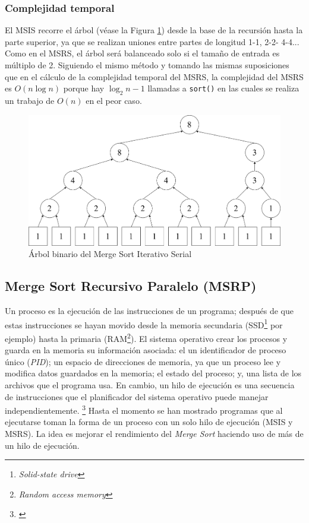 \documentclass[titlepage]{article}
\begin{document}
\subsubsection{Complejidad temporal}
El MSIS recorre el árbol (véase la Figura \ref{fig:arbolMSIS}) desde la base de la recursión hasta la parte superior, ya que se realizan uniones entre partes de longitud 1-1, 2-2- 4-4... Como en el MSRS, el árbol será balanceado solo si el tamaño de entrada es múltiplo de 2. Siguiendo el mismo método y tomando las mismas suposiciones que en el cálculo de la complejidad temporal del MSRS, la complejidad del MSRS es \(O(n \log{n})\) porque hay \(\log_2{n}-1\) llamadas a \lstinline{sort()} en las cuales se realiza un trabajo de \(O(n)\) en el peor caso.

\begin{figure}
    \centering
    \includegraphics[width=0.7\linewidth]{Diagrames/arbolMSISirregular.png}
    \caption{Árbol binario del Merge Sort Iterativo Serial}
    \label{fig:arbolMSIS}
\end{figure}


\newpage
\subsection{Merge Sort Recursivo Paralelo (MSRP)}
Un proceso es la ejecución de las instrucciones de un programa; después de que estas instrucciones se hayan movido desde la memoria secundaria (SSD\footnote{\textit{Solid-state drive}} por ejemplo) hasta la primaria (RAM\footnote{\textit{Random access memory}}). El sistema operativo crear los procesos y guarda en la memoria su información asociada: el un identificador de proceso único (\textit{PID}); un espacio de direcciones de memoria, ya que un proceso lee y modifica datos guardados en la memoria; el estado del proceso; y, una lista de los archivos que el programa usa. En cambio, un hilo de ejecución es una secuencia de instrucciones que el planificador del sistema operativo puede manejar independientemente. \footnote{\cite{bobrov-2023}} Hasta el momento se han mostrado programas que al ejecutarse toman la forma de un proceso con un solo hilo de ejecución (MSIS y MSRS). La idea es mejorar el rendimiento del \textit{Merge Sort} haciendo uso de más de un hilo de ejecución. 
\end{document}
